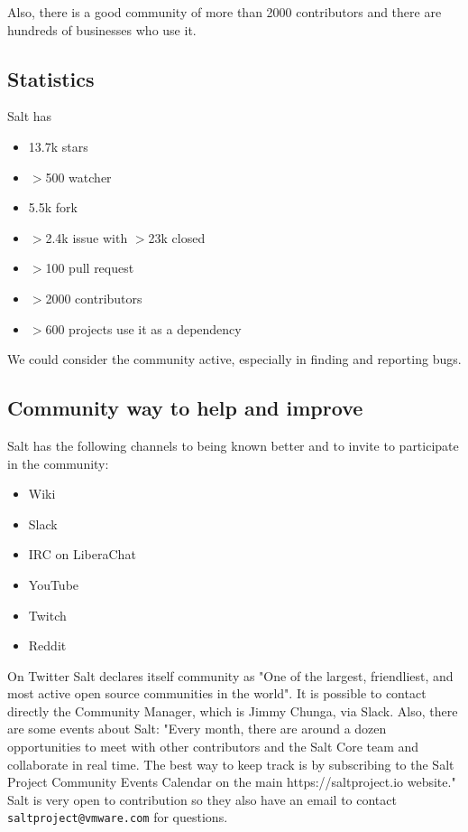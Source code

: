 \documentclass[12pt,a4paper,openright,twoside]{book}
\begin{document}
Also, there is a good community of more than 2000 contributors and there are hundreds of businesses who use it.

\subsection{Statistics}
Salt has 
\begin{itemize}
    \item 13.7k stars
    \item $>$500 watcher
    \item 5.5k fork
    \item $>$2.4k issue with $>$23k closed
    \item $>$100 pull request
    \item $>$2000 contributors
    \item $>$600 projects use it as a dependency
\end{itemize}

We could consider the community active, especially in finding and reporting bugs.

\subsection{Community way to help and improve}


Salt has the following channels to being known better and to invite to participate in the community:
\begin{itemize}
    \item Wiki
    \item Slack
    \item IRC on LiberaChat
    \item YouTube
    \item Twitch
    \item Reddit
\end{itemize}
On Twitter Salt declares itself community as "One of the largest, friendliest, and most active open source communities in the world"\cite{saltTwitter}.
It is possible to contact directly the Community Manager, which is Jimmy Chunga, via Slack.
Also, there are some events about Salt:
"Every month, there are around a dozen opportunities to meet with other contributors and the Salt Core team and collaborate in real time. The best way to keep track is by subscribing to the Salt Project Community Events Calendar on the main https://saltproject.io website."\cite{saltGitHub}
Salt is very open to contribution so they also have an email to contact \texttt{saltproject@vmware.com} for questions.
\end{document}
